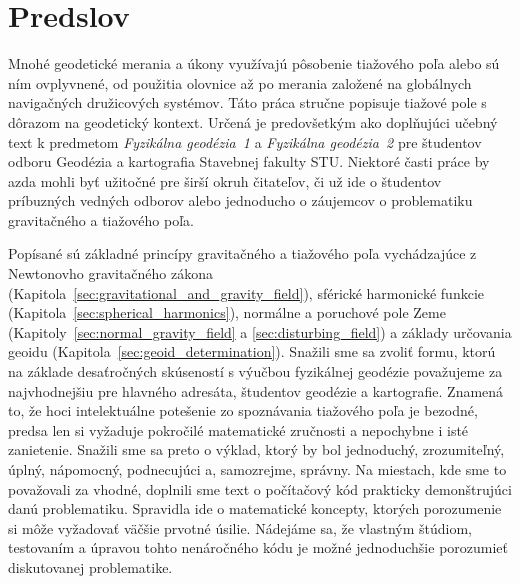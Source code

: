 \documentclass[a4paper, 12pt]{book}
\begin{document}
\tableofcontents
\newpage







\chapter*{Predslov}

Mnohé geodetické merania a úkony využívajú pôsobenie tiažového poľa alebo sú 
ním ovplyvnené, od použitia olovnice až po merania založené na globálnych 
navigačných družicových systémov.  Táto práca stručne popisuje tiažové pole 
s dôrazom na geodetický kontext.  Určená je predovšetkým ako doplňujúci učebný 
text k predmetom \emph{Fyzikálna geodézia~1} a \emph{Fyzikálna geodézia~2} pre 
študentov odboru Geodézia a kartografia Stavebnej fakulty STU.  Niektoré časti 
práce by azda mohli byť užitočné pre širší okruh čitateľov, či už ide 
o študentov príbuzných vedných odborov alebo jednoducho o záujemcov 
o problematiku gravitačného a tiažového poľa.

Popísané sú základné princípy gravitačného a tiažového poľa vychádzajúce 
z Newtonovho gravitačného zákona 
(Kapitola~\ref{sec:gravitational_and_gravity_field}), sférické harmonické 
funkcie (Kapitola~\ref{sec:spherical_harmonics}), normálne a poruchové pole 
Zeme (Kapitoly~\ref{sec:normal_gravity_field} a \ref{sec:disturbing_field}) 
a základy určovania geoidu (Kapitola~\ref{sec:geoid_determination}).  Snažili 
sme sa zvoliť formu, ktorú na základe desaťročných skúseností s výučbou 
fyzikálnej geodézie považujeme za najvhodnejšiu pre hlavného adresáta, 
študentov geodézie a kartografie.  Znamená to, že hoci intelektuálne potešenie 
zo spoznávania tiažového poľa je bezodné, predsa len si vyžaduje pokročilé 
matematické zručnosti a nepochybne i isté zanietenie.  Snažili sme sa preto 
o výklad, ktorý by bol jednoduchý, zrozumiteľný, úplný, nápomocný, podnecujúci 
a, samozrejme, správny.  Na miestach, kde sme to považovali za vhodné, doplnili 
sme text o počítačový kód prakticky demonštrujúci danú problematiku.  Spravidla 
ide o matematické koncepty, ktorých porozumenie si môže vyžadovať väčšie 
prvotné úsilie.  Nádejáme sa, že vlastným štúdiom, testovaním a úpravou tohto 
nenáročného kódu je možné jednoduchšie porozumieť diskutovanej problematike.
\end{document}
